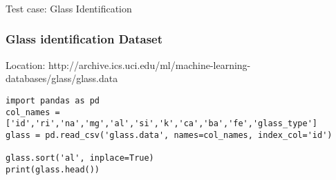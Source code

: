 





\begin{frame}[fragile]\frametitle{}
\begin{center}
{\Large Test case: Glass Identification}
\end{center}
\end{frame}

\begin{frame}[fragile]\frametitle{Glass identification Dataset}
Location: http://archive.ics.uci.edu/ml/machine-learning-databases/glass/glass.data
\begin{lstlisting}
import pandas as pd
col_names = ['id','ri','na','mg','al','si','k','ca','ba','fe','glass_type']
glass = pd.read_csv('glass.data', names=col_names, index_col='id')

glass.sort('al', inplace=True)
print(glass.head())
\end{lstlisting}
\end{frame}


